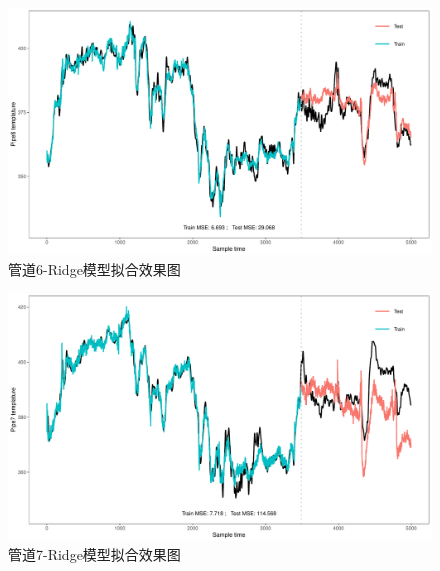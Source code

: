 \documentclass[
]{article}
\begin{document}
\begin{figure}

{\centering \includegraphics{TJRJCP_DuXingx_202105_files/figure-latex/unnamed-chunk-34-1} 

}

\caption{管道6-Ridge模型拟合效果图}\label{fig:unnamed-chunk-34}
\end{figure}

\begin{figure}

{\centering \includegraphics{TJRJCP_DuXingx_202105_files/figure-latex/unnamed-chunk-35-1} 

}

\caption{管道7-Ridge模型拟合效果图}\label{fig:unnamed-chunk-35}
\end{figure}
\end{document}
